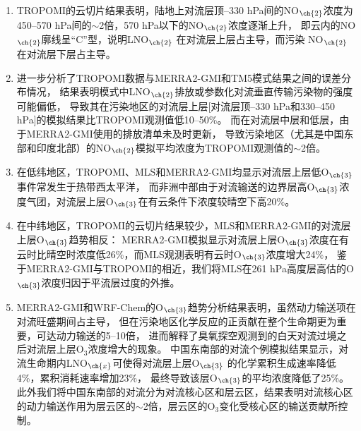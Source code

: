 \begin{enumerate}[label=（\arabic*）, labelindent=\parindent, nosep, leftmargin=0pt, widest=0, itemindent=*, topsep=0pt, partopsep=0pt, parsep=0pt]

\item TROPOMI的云切片结果表明，陆地上对流层顶--330 hPa间的NO$_{\ch{2}}$浓度为450--570 hPa间的$\sim$2倍，570 hPa以下的NO$_{\ch{2}}$浓度逐渐上升，
即云内的NO$_{\ch{2}}$廓线呈“C”型，说明LNO$_{\ch{2}}$ 在对流层上层占主导，而污染 NO$_{\ch{2}}$ 在对流层下层占主导。

\item 进一步分析了TROPOMI数据与MERRA2-GMI和TM5模式结果之间的误差分布情况，
结果表明模式中LNO$_{\ch{2}}$排放或参数化对流垂直传输污染物的强度可能偏低，
导致其在污染地区的对流层上层[对流层顶--330 hPa和330--450 hPa]的模拟结果比TROPOMI观测值低10--50\%。
而在对流层中层和低层，由于MERRA2-GMI使用的排放清单未及时更新，
导致污染地区（尤其是中国东部和印度北部）的NO$_{\ch{2}}$模拟平均浓度为TROPOMI观测值的$\sim$2倍。

\item 在低纬地区，TROPOMI、MLS和MERRA2-GMI均显示对流层上层低O$_{\ch{3}}$事件常发生于热带西太平洋，
而非洲中部由于对流输送的边界层高O$_{\ch{3}}$浓度气团，对流层上层O$_{\ch{3}}$在有云条件下浓度较晴空下高20\%。

\item 在中纬地区，TROPOMI的云切片结果较少，MLS和MERRA2-GMI的对流层上层O$_{\ch{3}}$趋势相反：
MERRA2-GMI模拟显示对流层上层O$_{\ch{3}}$浓度在有云时比晴空时浓度低26\%，而MLS观测表明有云时O$_{\ch{3}}$浓度增大24\%，
鉴于MERRA2-GMI与TROPOMI的相近，我们将MLS在261 hPa高度层高估的O$_{\ch{3}}$浓度归因于平流层过度的外推。

\item MERRA2-GMI和WRF-Chem的O$_{\ch{3}}$趋势分析结果表明，虽然动力输送项在对流旺盛期间占主导，
但在污染地区化学反应的正贡献在整个生命期更为重要，可达动力输送的5--10倍，
进而解释了臭氧探空观测到的白天对流过境之后对流层上层O$_3$浓度增大的现象。
中国东南部的对流个例模拟结果显示，对流生命期内LNO$_{\ch{x}}$可使得对流层上层O$_{\ch{3}}$
的化学累积生成速率降低4\%，累积消耗速率增加23\%，
最终导致该层O$_{\ch{3}}$的平均浓度降低了25\%。
此外我们将中国东南部的对流分为对流核心区和层云区，结果表明对流核心区的动力输送作用为层云区的$\sim$2倍，层云区的O$_3$变化受核心区的输送贡献所控制。

\end{enumerate}

